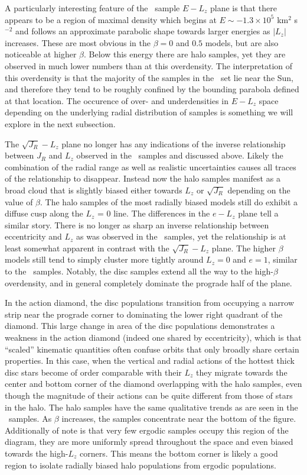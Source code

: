 A particularly interesting feature of the \survey\ sample $E-L_{z}$ plane is that there appears to be a region of maximal density which begins at $E \sim -1.3\times10^{5}$ km$^{2}$ s$^{-2}$ and follows an approximate parabolic shape towards larger energies as $\lvert L_{z} \rvert$ increases. These are most obvious in the $\beta=0$ and $0.5$ models, but are also noticeable at higher $\beta$. Below this energy there are halo samples, yet they are observed in much lower numbers than at this overdensity. The interpretation of this overdensity is that the majority of the samples in the \survey\ set lie near the Sun, and therefore they tend to be roughly confined by the bounding parabola defined at that location. The occurence of over- and underdensities in $E-L_{z}$ space depending on the underlying radial distribution of samples is something we will explore in the next subsection.

The $\sqrt{J_{R}}-L_{z}$ plane no longer has any indications of the inverse relationship between $J_{R}$ and $L_{z}$ observed in the \solar\ samples and discussed above. Likely the combination of the radial range as well as realistic uncertainties causes all traces of the relationship to disappear. Instead now the halo samples manifest as a broad cloud that is slightly biased either towards $L_{z}$ or $\sqrt{J_{R}}$ depending on the value of $\beta$. The halo samples of the most radially biased models still do exhibit a diffuse cusp along the $L_{z}$ = 0 line. The differences in the $e-L_{z}$ plane tell a similar story. There is no longer as sharp an inverse relationship between eccentricity and $L_{z}$ as was observed in the \solar\ samples, yet the relationship is at least somewhat apparent in contrast with the $\sqrt{J_{R}}-L_{z}$ plane. The higher $\beta$ models still tend to simply cluster more tightly around $L_{z}=0$ and $e=1$, similar to the \solar\ samples. Notably, the disc samples extend all the way to the high-$\beta$ overdensity, and in general completely dominate the prograde half of the plane.

In the action diamond, the disc populations transition from occupying a narrow strip near the prograde corner to dominating the lower right quadrant of the diamond. This large change in area of the disc populations demonstrates a weakness in the action diamond (indeed one shared by eccentricity), which is that ``scaled'' kinematic quantities often confuse orbits that only broadly share certain properties. In this case, when the vertical and radial actions of the hottest thick disc stars become of order comparable with their $L_{z}$ they migrate towards the center and bottom corner of the diamond overlapping with the halo samples, even though the magnitude of their actions can be quite different from those of stars in the halo. The halo samples have the same qualitative trends as are seen in the \solar\ samples. As $\beta$ increases, the samples concentrate near the bottom of the figure. Additionally of note is that very few ergodic samples occupy this region of the diagram, they are more uniformly spread throughout the space and even biased towards the high-$L_{z}$ corners. This means the bottom corner is likely a good region to isolate radially biased halo populations from ergodic populations.

